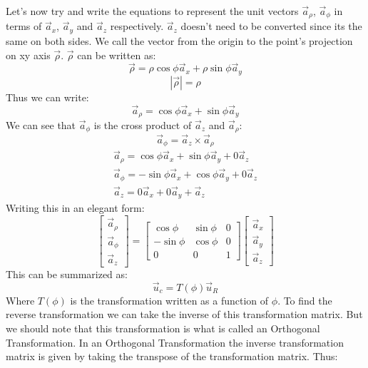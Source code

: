             Let's now try and write the equations to represent the unit vectors $\vec{a}_\rho$, $\vec{a}_\phi$ in terms of $\vec{a}_x$, $\vec{a}_y$ and $\vec{a}_z$ respectively. $\vec{a}_z$ doesn't need to be converted since its the same on both sides.
            We call the vector from the origin to the point's projection on xy axis $\vec{\rho}$. $\vec{\rho}$ can be written as:
            $$\vec{\rho} = \rho\cos\phi\vec{a}_x + \rho\sin\phi\vec{a}_y$$
            $$|\vec{\rho}| = \rho$$
            Thus we can write:
            $$\vec{a}_\rho = \cos\phi\vec{a}_x + \sin\phi\vec{a}_y$$
            We can see that $\vec{a}_\phi$ is the cross product of $\vec{a}_z$ and $\vec{a}_\rho$:
            $$\vec{a}_\phi = \vec{a}_z\times\vec{a}_\rho$$
            \begin{align}
                \vec{a}_\rho = \cos\phi\vec{a}_x + \sin\phi\vec{a}_y + 0\vec{a}_z \\ 
                \vec{a}_\phi = -\sin\phi\vec{a}_x + \cos\phi\vec{a}_y + 0\vec{a}_z \\
                \vec{a}_z = 0\vec{a}_x + 0\vec{a}_y + \vec{a}_z
            \end{align}
            Writing this in an elegant form:
            \begin{equation}
                \begin{bmatrix}
                    \vec{a}_\rho \\ \vec{a}_\phi \\ \vec{a}_z 
                \end{bmatrix} = 
                \begin{bmatrix}
                    \cos\phi & \sin\phi & 0 \\
                    -\sin\phi & \cos\phi & 0 \\
                    0 & 0 & 1
                \end{bmatrix}
                \begin{bmatrix}
                    \vec{a}_x \\
                    \vec{a}_y \\
                    \vec{a}_z
                \end{bmatrix}
            \end{equation}
            This can be summarized as:
            $$\vec{u}_c = T\left(\phi\right)\vec{u}_R$$
            Where $T\left(\phi\right)$ is the transformation written as a function of $\phi$. To find the reverse transformation we can take the inverse of this transformation matrix. But we should note that this transformation is what is called an Orthogonal Transformation. In an Orthogonal Transformation the inverse transformation matrix is given by taking the transpose of the transformation matrix. Thus:
